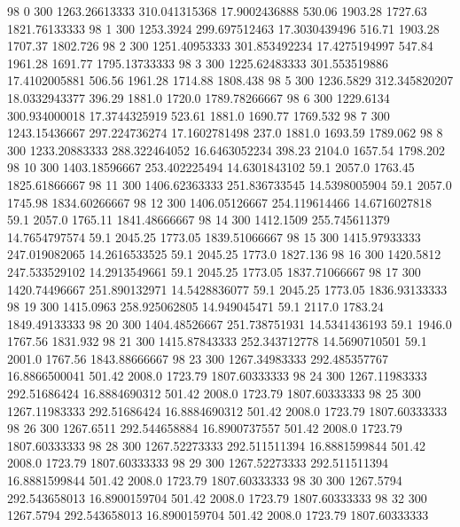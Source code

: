 98  0  300  1263.26613333  310.041315368  17.9002436888  530.06  1903.28  1727.63  1821.76133333 
98  1  300  1253.3924  299.697512463  17.3030439496  516.71  1903.28  1707.37  1802.726 
98  2  300  1251.40953333  301.853492234  17.4275194997  547.84  1961.28  1691.77  1795.13733333 
98  3  300  1225.62483333  301.553519886  17.4102005881  506.56  1961.28  1714.88  1808.438 
98  5  300  1236.5829  312.345820207  18.0332943377  396.29  1881.0  1720.0  1789.78266667 
98  6  300  1229.6134  300.934000018  17.3744325919  523.61  1881.0  1690.77  1769.532 
98  7  300  1243.15436667  297.224736274  17.1602781498  237.0  1881.0  1693.59  1789.062 
98  8  300  1233.20883333  288.322464052  16.6463052234  398.23  2104.0  1657.54  1798.202 
98  10  300  1403.18596667  253.402225494  14.6301843102  59.1  2057.0  1763.45  1825.61866667 
98  11  300  1406.62363333  251.836733545  14.5398005904  59.1  2057.0  1745.98  1834.60266667 
98  12  300  1406.05126667  254.119614466  14.6716027818  59.1  2057.0  1765.11  1841.48666667 
98  14  300  1412.1509  255.745611379  14.7654797574  59.1  2045.25  1773.05  1839.51066667 
98  15  300  1415.97933333  247.019082065  14.2616533525  59.1  2045.25  1773.0  1827.136 
98  16  300  1420.5812  247.533529102  14.2913549661  59.1  2045.25  1773.05  1837.71066667 
98  17  300  1420.74496667  251.890132971  14.5428836077  59.1  2045.25  1773.05  1836.93133333 
98  19  300  1415.0963  258.925062805  14.949045471  59.1  2117.0  1783.24  1849.49133333 
98  20  300  1404.48526667  251.738751931  14.5341436193  59.1  1946.0  1767.56  1831.932 
98  21  300  1415.87843333  252.343712778  14.5690710501  59.1  2001.0  1767.56  1843.88666667 
98  23  300  1267.34983333  292.485357767  16.8866500041  501.42  2008.0  1723.79  1807.60333333 
98  24  300  1267.11983333  292.51686424  16.8884690312  501.42  2008.0  1723.79  1807.60333333 
98  25  300  1267.11983333  292.51686424  16.8884690312  501.42  2008.0  1723.79  1807.60333333 
98  26  300  1267.6511  292.544658884  16.8900737557  501.42  2008.0  1723.79  1807.60333333 
98  28  300  1267.52273333  292.511511394  16.8881599844  501.42  2008.0  1723.79  1807.60333333 
98  29  300  1267.52273333  292.511511394  16.8881599844  501.42  2008.0  1723.79  1807.60333333 
98  30  300  1267.5794  292.543658013  16.8900159704  501.42  2008.0  1723.79  1807.60333333 
98  32  300  1267.5794  292.543658013  16.8900159704  501.42  2008.0  1723.79  1807.60333333 

